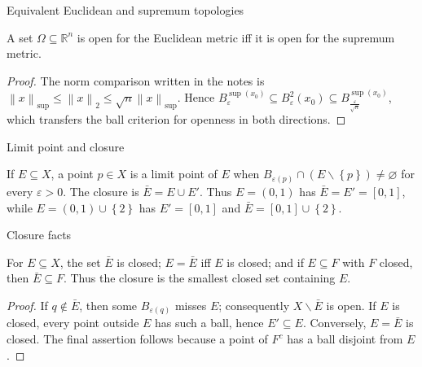 \begin{lemma}{Equivalent Euclidean and supremum topologies}

A set \(\Omega \subseteq \mathbb{R}^{n}\) is open for the Euclidean metric iff it is open for the supremum metric.

\end{lemma}

\begin{proof}

The norm comparison written in the notes is \(\left\| x \right\|_{\sup} \leq \left\| x \right\|_{2} \leq \sqrt{n}\left\| x \right\|_{\sup}\). Hence \(B_{\varepsilon}^{\sup{(x_{0})}} \subseteq B_{\varepsilon}^{2}\left( x_{0} \right) \subseteq B_{\frac{\varepsilon}{\sqrt{n}}}^{\sup{(x_{0})}}\), which transfers the ball criterion for openness in both directions.

\end{proof}

\begin{definition}{Limit point and closure}

If \(E \subseteq X\), a point \(p \in X\) is a limit point of \(E\) when \(B_{\varepsilon{(p)}} \cap \left( {E\backslash\left\{ p \right\}} \right) \neq \varnothing\) for every \(\varepsilon > 0\). The closure is \(\bar{E} = E \cup E'\). Thus \(E = \left( {0,1} \right)\) has \(\bar{E} = E' = \left\lbrack {0,1} \right\rbrack\), while \(E = \left( {0,1} \right) \cup \left\{ 2 \right\}\) has \(E' = \left\lbrack {0,1} \right\rbrack\) and \(\bar{E} = \left\lbrack {0,1} \right\rbrack \cup \left\{ 2 \right\}\).

\end{definition}

\begin{lemma}{Closure facts}

For \(E \subseteq X\), the set \(\bar{E}\) is closed; \(E = \bar{E}\) iff \(E\) is closed; and if \(E \subseteq F\) with \(F\) closed, then \(\bar{E} \subseteq F\). Thus the closure is the smallest closed set containing \(E\).

\end{lemma}

\begin{proof}

If \(q \notin \bar{E}\), then some \(B_{\varepsilon{(q)}}\) misses \(E\); consequently \(X\backslash\bar{E}\) is open. If \(E\) is closed, every point outside \(E\) has such a ball, hence \(E' \subseteq E\). Conversely, \(E = \bar{E}\) is closed. The final assertion follows because a point of \(F^{c}\) has a ball disjoint from \(E\).

\end{proof}

